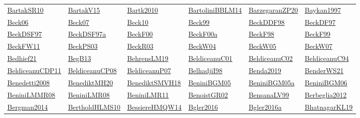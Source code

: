 \begin{longtable}{*{6}{l}}
\hyperref[detail:BartakSR10]{BartakSR10} & \hyperref[detail:BartakV15]{BartakV15} & \hyperref[detail:Bartk2010]{Bartk2010} & \hyperref[detail:BartoliniBBLM14]{BartoliniBBLM14} & \hyperref[detail:BarzegaranZP20]{BarzegaranZP20} & \hyperref[detail:Baykan1997]{Baykan1997}\\ 
\hyperref[detail:Beck06]{Beck06} & \hyperref[detail:Beck07]{Beck07} & \hyperref[detail:Beck10]{Beck10} & \hyperref[detail:Beck99]{Beck99} & \hyperref[detail:BeckDDF98]{BeckDDF98} & \hyperref[detail:BeckDF97]{BeckDF97}\\ 
\hyperref[detail:BeckDSF97]{BeckDSF97} & \hyperref[detail:BeckDSF97a]{BeckDSF97a} & \hyperref[detail:BeckF00]{BeckF00} & \hyperref[detail:BeckF00a]{BeckF00a} & \hyperref[detail:BeckF98]{BeckF98} & \hyperref[detail:BeckF99]{BeckF99}\\ 
\hyperref[detail:BeckFW11]{BeckFW11} & \hyperref[detail:BeckPS03]{BeckPS03} & \hyperref[detail:BeckR03]{BeckR03} & \hyperref[detail:BeckW04]{BeckW04} & \hyperref[detail:BeckW05]{BeckW05} & \hyperref[detail:BeckW07]{BeckW07}\\ 
\hyperref[detail:Bedhief21]{Bedhief21} & \hyperref[detail:BegB13]{BegB13} & \hyperref[detail:BehrensLM19]{BehrensLM19} & \hyperref[detail:BeldiceanuC01]{BeldiceanuC01} & \hyperref[detail:BeldiceanuC02]{BeldiceanuC02} & \hyperref[detail:BeldiceanuC94]{BeldiceanuC94}\\ 
\hyperref[detail:BeldiceanuCDP11]{BeldiceanuCDP11} & \hyperref[detail:BeldiceanuCP08]{BeldiceanuCP08} & \hyperref[detail:BeldiceanuP07]{BeldiceanuP07} & \hyperref[detail:BelhadjiI98]{BelhadjiI98} & \hyperref[detail:Benda2019]{Benda2019} & \hyperref[detail:BenderWS21]{BenderWS21}\\ 
\hyperref[detail:Benedetti2008]{Benedetti2008} & \hyperref[detail:BenediktMH20]{BenediktMH20} & \hyperref[detail:BenediktSMVH18]{BenediktSMVH18} & \hyperref[detail:BeniniBGM05]{BeniniBGM05} & \hyperref[detail:BeniniBGM05a]{BeniniBGM05a} & \hyperref[detail:BeniniBGM06]{BeniniBGM06}\\ 
\hyperref[detail:BeniniLMMR08]{BeniniLMMR08} & \hyperref[detail:BeniniLMR08]{BeniniLMR08} & \hyperref[detail:BeniniLMR11]{BeniniLMR11} & \hyperref[detail:BenoistGR02]{BenoistGR02} & \hyperref[detail:BensanaLV99]{BensanaLV99} & \hyperref[detail:Berbeglia2012]{Berbeglia2012}\\ 
\hyperref[detail:Bergman2014]{Bergman2014} & \hyperref[detail:BertholdHLMS10]{BertholdHLMS10} & \hyperref[detail:BessiereHMQW14]{BessiereHMQW14} & \hyperref[detail:Bgler2016]{Bgler2016} & \hyperref[detail:Bgler2016a]{Bgler2016a} & \hyperref[detail:BhatnagarKL19]{BhatnagarKL19}\\ 

\end{longtable}
